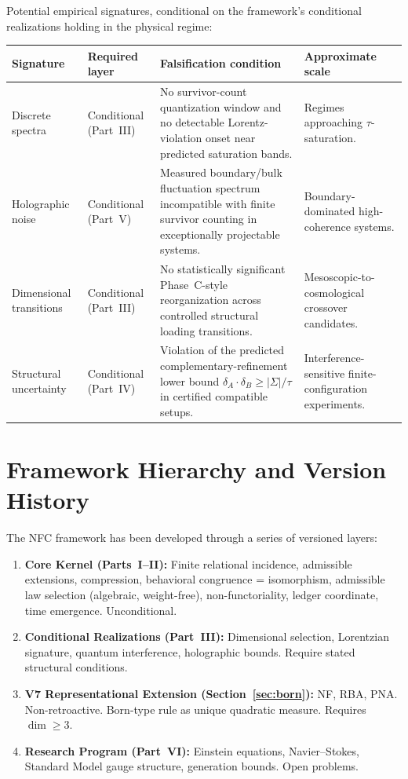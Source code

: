 \documentclass[11pt,a4paper]{article}
\theoremstyle{definition}
\theoremstyle{remark}
\begin{document}
Potential empirical signatures, conditional on the framework's conditional realizations holding in the physical regime:

\begin{center}\small
\begin{tabular}{p{3.2cm}p{2.2cm}p{5.2cm}p{3.2cm}}
\toprule
\textbf{Signature} & \textbf{Required layer} & \textbf{Falsification condition} & \textbf{Approximate scale} \\
\midrule
Discrete spectra & Conditional (Part~III) & No survivor-count quantization window and no detectable Lorentz-violation onset near predicted saturation bands. & Regimes approaching $\tau$-saturation. \\
\addlinespace
Holographic noise & Conditional (Part~V) & Measured boundary/bulk fluctuation spectrum incompatible with finite survivor counting in exceptionally projectable systems. & Boundary-dominated high-coherence systems. \\
\addlinespace
Dimensional transitions & Conditional (Part~III) & No statistically significant Phase~C-style reorganization across controlled structural loading transitions. & Mesoscopic-to-cosmological crossover candidates. \\
\addlinespace
Structural uncertainty & Conditional (Part~IV) & Violation of the predicted complementary-refinement lower bound $\delta_A \cdot \delta_B \geq |\Sigma|/\tau$ in certified compatible setups. & Interference-sensitive finite-configuration experiments. \\
\bottomrule
\end{tabular}
\end{center}

\section{Framework Hierarchy and Version History}\label{app:hierarchy}

The NFC framework has been developed through a series of versioned layers:
\begin{enumerate}
  \item \textbf{Core Kernel (Parts~I--II):} Finite relational incidence, admissible extensions, compression, behavioral congruence = isomorphism, admissible law selection (algebraic, weight-free), non-functoriality, ledger coordinate, time emergence. Unconditional.
  \item \textbf{Conditional Realizations (Part~III):} Dimensional selection, Lorentzian signature, quantum interference, holographic bounds. Require stated structural conditions.
  \item \textbf{V7 Representational Extension (Section~\ref{sec:born}):} NF, RBA, PNA. Non-retroactive. Born-type rule as unique quadratic measure. Requires $\dim \geq 3$.
  \item \textbf{Research Program (Part~VI):} Einstein equations, Navier--Stokes, Standard Model gauge structure, generation bounds. Open problems.
\end{enumerate}
\end{document}
